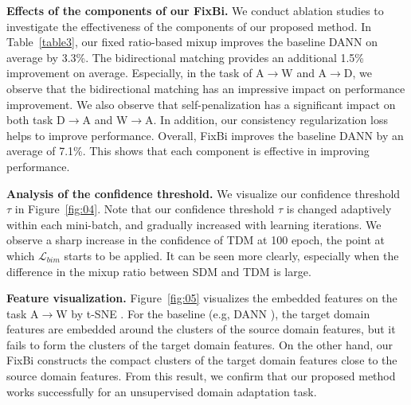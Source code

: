 \documentclass[final]{cvpr}
\begin{document}
\textbf{Effects of the components of our FixBi.} We conduct ablation studies to investigate the effectiveness of the components of our proposed method. In Table~\ref{table3}, our fixed ratio-based mixup improves the baseline DANN \cite{Ganin2015} on average by 3.3\%. The bidirectional matching provides an additional 1.5\% improvement on average. Especially, in the task of A$\rightarrow$W and A$\rightarrow$D, we observe that the bidirectional matching has an impressive impact on performance improvement. We also observe that self-penalization has a significant impact on both task D$\rightarrow$A and W$\rightarrow$A. In addition, our consistency regularization loss helps to improve performance. Overall, FixBi improves the baseline DANN by an average of 7.1\%. This shows that each component is effective in improving performance.

\textbf{Analysis of the confidence threshold.} We visualize our confidence threshold $\tau$ in Figure~\ref{fig:04}. Note that our confidence threshold $\tau$ is changed adaptively within each mini-batch, and gradually increased with learning iterations. We observe a sharp increase in the confidence of TDM at 100 epoch, the point at which $\mathcal {L} _ {bim} $ starts to be applied. It can be seen more clearly, especially when the difference in the mixup ratio between SDM and TDM is large.

\textbf{Feature visualization.} Figure~\ref{fig:05} visualizes the embedded features on the task A$\rightarrow$W by t-SNE \cite{tSNE}. For the baseline (e.g, DANN \cite{Ganin2015}), the target domain features are embedded around the clusters of the source domain features, but it fails to form the clusters of the target domain features. On the other hand, our FixBi constructs the compact clusters of the target domain features close to the source domain features. From this result, we confirm that our proposed method works successfully for an unsupervised domain adaptation task.
\end{document}
